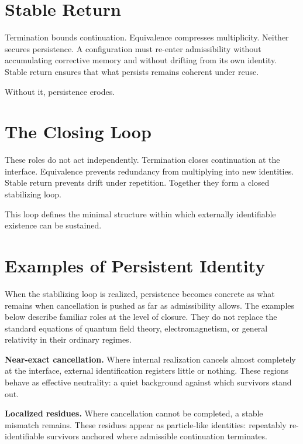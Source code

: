 \documentclass[11pt,twoside,openright]{book}
\begin{document}
\section*{Stable Return}

Termination bounds continuation. Equivalence compresses multiplicity. Neither secures persistence. A configuration must re-enter admissibility without accumulating corrective memory and without drifting from its own identity. Stable return ensures that what persists remains coherent under reuse.

Without it, persistence erodes.

\section*{The Closing Loop}

These roles do not act independently. Termination closes continuation at the interface. Equivalence prevents redundancy from multiplying into new identities. Stable return prevents drift under repetition. Together they form a closed stabilizing loop.

This loop defines the minimal structure within which externally identifiable existence can be sustained.

\section*{Examples of Persistent Identity}

When the stabilizing loop is realized, persistence becomes concrete as what remains when cancellation is pushed as far as admissibility allows. The examples below describe familiar roles at the level of closure. They do not replace the standard equations of quantum field theory, electromagnetism, or general relativity in their ordinary regimes.

\medskip

\textbf{Near-exact cancellation.}
Where internal realization cancels almost completely at the interface,
external identification registers little or nothing.
These regions behave as effective neutrality:
a quiet background against which survivors stand out.

\medskip

\textbf{Localized residues.}
Where cancellation cannot be completed,
a stable mismatch remains.
These residues appear as particle-like identities:
repeatably re-identifiable survivors
anchored where admissible continuation terminates.
\end{document}
